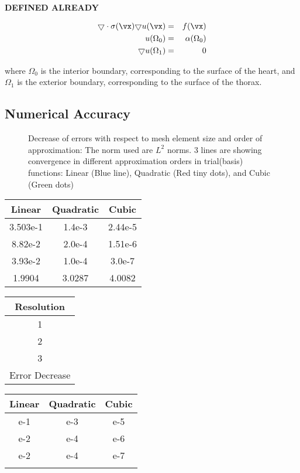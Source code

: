 {\bf DEFINED ALREADY}

\begin{eqnarray}
\bigtriangledown \cdot {\sigma(\vx) \bigtriangledown}u(\vx) & = & f(\vx)\\
u(\Omega_{0}) & = & \alpha(\Omega_{0}) \\
\bigtriangledown u(\Omega_{1}) & = & 0
\end{eqnarray}

where $\Omega_{0}$ is the interior boundary, corresponding to the
surface of the heart, and $\Omega_{1}$ is the exterior boundary,
corresponding to the surface of the thorax.


\subsection{Numerical Accuracy}

\begin{figure}[h]
\begin{center}
  \caption{\label{torsoerr} Decrease of errors with respect to mesh element size and order of approximation: The norm used are $L^{2}$ norms. 3 lines are showing convergence in different approximation orders in trial(basis) functions: Linear (Blue line), Quadratic (Red tiny dots), and Cubic (Green dots)}
\end{center}
\end{figure}

\begin{center}
\begin{tabular}{|c|c|c|} \hline
    Linear& Quadratic & Cubic \\ \hline \hline
    3.503e-1 & 1.4e-3 & 2.44e-5\\ \hline
    8.82e-2     & 2.0e-4 & 1.51e-6\\ \hline
    3.93e-2  & 1.0e-4 &    3.0e-7\\ \hline \hline
    1.9904& 3.0287&    4.0082\\ \hline
\end{tabular}
\begin{tabular}{|c|} \hline
    Resolution\\ \hline \hline
    1\\ \hline
    2\\ \hline
    3\\ \hline \hline
    Error Decrease  \\ \hline
\end{tabular}
\begin{tabular}{|c|c|c|} \hline
    Linear& Quadratic & Cubic \\ \hline \hline
    e-1 & e-3 & e-5\\ \hline
    e-2 & e-4 & e-6\\ \hline
    e-2 & e-4 & e-7\\ \hline \hline
    & &   \\ \hline
\end{tabular}
\end{center}




